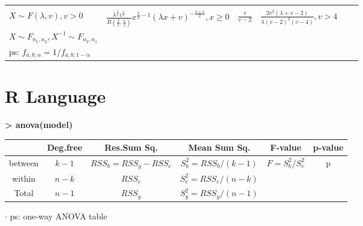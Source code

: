 \documentclass[9pt]{article}
\begin{document}
\begin{longtable}{|l||l|c|c|c|l|}
        \hline
        \begin{tabular}{@{}p{4.05cm}@{}}F \\ $X\sim F(\lambda,v),v>0$\end{tabular}                                & $\frac{\lambda^{\frac{\lambda}{2}}v^{\frac{v}{2}}}{B(\frac{\lambda}{2},\frac{v}{2})}x^{\frac{\lambda}{2}-1}(\lambda x+v)^{-\frac{\lambda+v}{2}},x\geq0$ & $\frac{v}{v-2}$                & $\frac{2v^2(\lambda+v-2)}{\lambda(v-2)^2(v-4)},v>4$    & \begin{tabular}{@{}l@{}} $Y_1,Y_2\sim\chi^2_{n_1},\chi^2_{n_2},X=\frac{Y_1/n_1}{Y_2/n_2}$ \\ $X\sim F_{n_1,n_2},X^{-1}\sim F_{n_2,n_1}$\end{tabular} \\
        \hline
        \multicolumn{5}{|l|}{ps: $f_{a,b;\alpha}=1/f_{a,b;1-\alpha}$}                                                                                                                                                                                                                                                                                                                                                                                                                                                                                              \\
        \hline
    \end{longtable}
    \vspace{-0.4cm}

    \section{R Language}

    \textbf{> anova(model)}
    \vspace{-0.4cm}
    \begin{longtable}{c|ccccc}
                & Deg.free & Res.Sum Sq.         & Mean Sum Sq.        & F-value         & p-value \\
        \hline
        between & $k-1$    & $RSS_b=RSS_y-RSS_e$ & $S^2_b=RSS_b/(k-1)$ & $F=S^2_b/S^2_e$ & p       \\
        within  & $n-k$    & $RSS_e$             & $S^2_e=RSS_e/(n-k)$ &                 &         \\
        \hline
        Total   & $n-1$    & $RSS_y$             & $S^2_y=RSS_y/(n-1)$ &                 &         \\
    \end{longtable}
    \vspace{-0.4cm}
$\cdot$ ps: one-way ANOVA table
\end{document}
